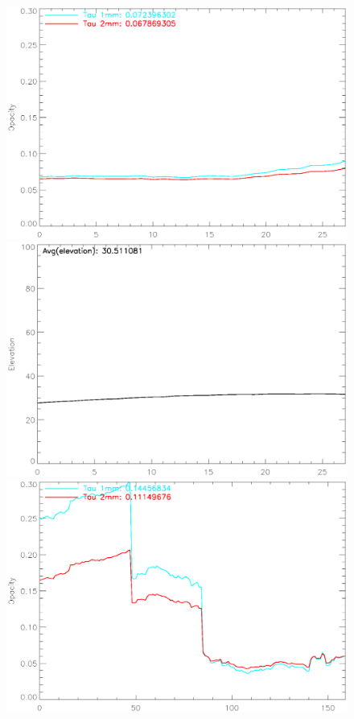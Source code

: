 \begin{figure}[htpb]
\begin{center}
\includegraphics[clip, angle=0, scale=0.4]{Figures/Pluto_5_opacity.eps}
\includegraphics[clip, angle=0, scale=0.4]{Figures/Pluto_5_elevation.eps}
\includegraphics[clip, angle=0, scale=0.4]{Figures/HLS091828_5_opacity.eps}

\end{center}
\end{figure}
